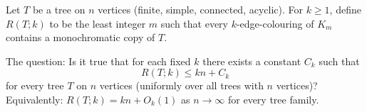 Let $T$ be a tree on $n$ vertices (finite, simple, connected, acyclic).
For $k\ge 1$, define $R(T;k)$ to be the least integer $m$ such that every $k$-edge-colouring of $K_m$ contains a monochromatic copy of $T$.

The question: Is it true that for each fixed $k$ there exists a constant $C_k$ such that
\[
R(T;k)\le kn + C_k
\]
for every tree $T$ on $n$ vertices (uniformly over all trees with $n$ vertices)?
Equivalently: $R(T;k)=kn+O_k(1)$ as $n\to\infty$ for every tree family.
